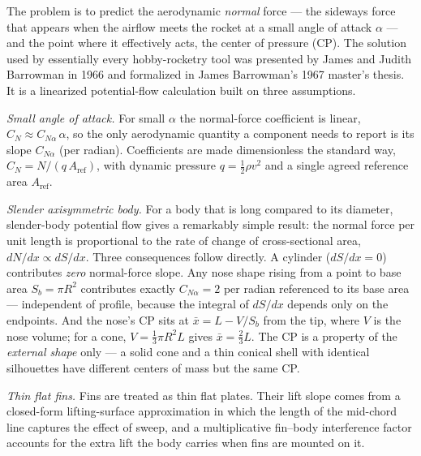 \begin{physbox}
The problem is to predict the aerodynamic \emph{normal} force --- the sideways force that
appears when the airflow meets the rocket at a small angle of attack $\alpha$ --- and the
point where it effectively acts, the center of pressure (CP). The solution used by
essentially every hobby-rocketry tool was presented by James and Judith Barrowman in 1966
and formalized in James Barrowman's 1967 master's thesis. It is a linearized potential-flow
calculation built on three assumptions.

\emph{Small angle of attack.} For small $\alpha$ the normal-force coefficient is linear,
$C_N \approx C_{N\alpha}\,\alpha$, so the only aerodynamic quantity a component needs to
report is its slope $C_{N\alpha}$ (per radian). Coefficients are made dimensionless the
standard way, $C_N = N/(q\,A_{\mathrm{ref}})$, with dynamic pressure
$q = \tfrac{1}{2}\rho v^2$ and a single agreed reference area $A_{\mathrm{ref}}$.

\emph{Slender axisymmetric body.} For a body that is long compared to its diameter,
slender-body potential flow gives a remarkably simple result: the normal force per unit
length is proportional to the rate of change of cross-sectional area, $dN/dx \propto dS/dx$.
Three consequences follow directly. A cylinder ($dS/dx = 0$) contributes \emph{zero}
normal-force slope. Any nose shape rising from a point to base area $S_b = \pi R^2$
contributes exactly $C_{N\alpha} = 2$ per radian referenced to its base area --- independent
of profile, because the integral of $dS/dx$ depends only on the endpoints. And the nose's CP
sits at $\bar{x} = L - V/S_b$ from the tip, where $V$ is the nose volume; for a cone,
$V = \tfrac{1}{3}\pi R^2 L$ gives $\bar{x} = \tfrac{2}{3}L$. The CP is a property of the
\emph{external shape} only --- a solid cone and a thin conical shell with identical
silhouettes have different centers of mass but the same CP.

\emph{Thin flat fins.} Fins are treated as thin flat plates. Their lift slope comes from a
closed-form lifting-surface approximation in which the length of the mid-chord line captures
the effect of sweep, and a multiplicative fin--body interference factor accounts for the
extra lift the body carries when fins are mounted on it.


\end{physbox}
